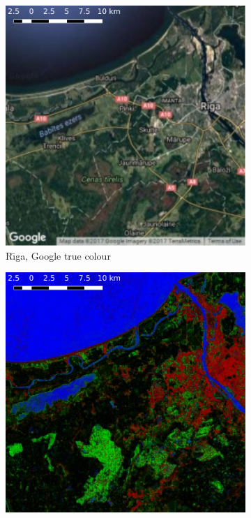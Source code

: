 \documentclass[a4paper,12pt]{scrbook}
\begin{document}
\begin{figure}
  \ContinuedFloat
  \centering
  \begin{subfigure}[t]{.24\textwidth}
    \includegraphics[width=\textwidth]{thesis-figures/figures-qgis/riga-google}
    \caption{R\={\i}ga, Google true colour}
  \end{subfigure} \hfill
  \begin{subfigure}[t]{.24\textwidth}
    \includegraphics[width=\textwidth]{thesis-figures/figures-qgis/riga-rf}

\end{subfigure}
\end{figure}
\end{document}

